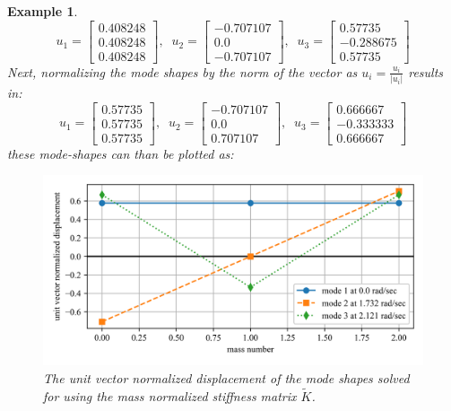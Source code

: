 \documentclass[12pt,letter]{article}
\newtheorem{ex}{Example}
\numberwithin{ex}{section} %
\newenvironment{example}{\begin{mdframed}[middlelinewidth=0.5mm]\begin{ex}\normalfont}{\end{ex}\end{mdframed}}
\numberwithin{re}{section} %
\begin{document}
\begin{example}
\begin{equation}
\end{equation}
\begin{equation}
u_1 = \begin{bmatrix} 0.408248 \\    0.408248 \\    0.408248  \end{bmatrix}, \; \; u_2 = \begin{bmatrix} -0.707107 \\    0.0 \\    -0.707107 \end{bmatrix}, \; \; u_3 = \begin{bmatrix} 0.57735 \\    -0.288675 \\    0.57735  \end{bmatrix}
\end{equation}
Next, normalizing the mode shapes by the norm of the vector as $u_i = \frac{u_i}{|u_i|}$ results in:
\begin{equation}
u_1 = \begin{bmatrix} 0.57735 \\    0.57735 \\    0.57735  \end{bmatrix}, \; \; u_2 = \begin{bmatrix} -0.707107 \\    0.0 \\    0.707107 \end{bmatrix}, \; \; u_3 = \begin{bmatrix} 0.666667 \\    -0.333333 \\    0.666667  \end{bmatrix}
\end{equation}
these mode-shapes can than be plotted as:
\begin{figure}[H]
	\centering
	\includegraphics[width=\linewidth]{../Figures/mode_shape_aiplane_example_normalized_stiffness.png}
	\caption{The unit vector normalized displacement of the mode shapes solved for using the mass normalized stiffness matrix $\tilde{K}$.}
	\label{fig:mode_shape_aiplane_example_normalized_stiffness}
\end{figure}




\end{example}
\end{document}
